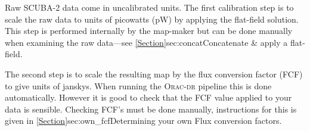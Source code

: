 Raw SCUBA-2 data come in uncalibrated units. The first calibration
step is to scale the raw data to units of picowatts (pW)
by applying the flat-field solution. This step is performed internally
by the map-maker but can be done manually when examining the raw
data---see \cref{Section}{sec:concat}{Concatenate \& apply a
  flat-field}.

The second step is to scale the resulting map by the flux conversion factor
(FCF) to give units of janskys. When running the
\textsc{Orac-dr} pipeline this is done automatically.
However it is good to check that the FCF value applied to your data is sensible.
Checking FCF's must be done manually, instructions for this is
given in \cref{Section}{sec:own_fcf}{Determining your own Flux conversion
  factors}.


